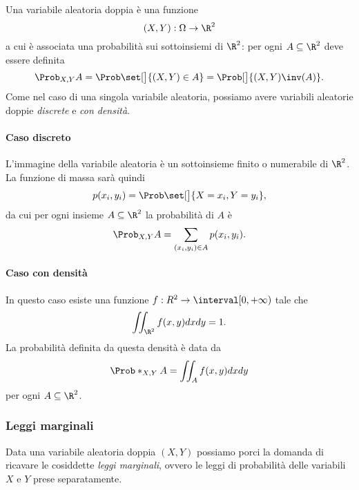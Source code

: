 Una variabile aleatoria doppia è una funzione \[
    (X, Y) : \Omega \to \R^2    
\] a cui è associata una probabilità sui sottoinsiemi di $\R^2$: per ogni $A \subseteq \R^2$ deve essere definita \[
    \Prob_{X, Y}{A} = \Prob\set[\big]{(X, Y) \in A} = \Prob[\big]{(X, Y)\inv (A)}.   
\]
Come nel caso di una singola variabile aleatoria, possiamo avere variabili aleatorie doppie \emph{discrete} e \emph{con densità}.

\paragraph{Caso discreto} L'immagine della variabile aleatoria è un sottoinsieme finito o numerabile di $\R^2$. La funzione di massa sarà quindi \[
    p(x_i, y_i) = \Prob\set[\big]{X = x_i, Y = y_i},    
\] da cui per ogni insieme $A \subseteq \R^2$ la probabilità di $A$ è \[
    \Prob_{X, Y}{A} = \sum_{(x_i, y_i) \in A} p(x_i, y_i).    
\]

\paragraph{Caso con densità} In questo caso esiste una funzione $f : R^2 \to \interval[{0, +\infty})$ tale che \[
    \iint_{\R^2} f(x, y)dxdy = 1.    
\] La probabilità definita da questa densità è data da \[
    \Prob*_{X, Y}{A} = \iint_{A} f(x, y)dxdy    
\] per ogni $A \subseteq \R^2$.

\subsubsection{Leggi marginali}
Data una variabile aleatoria doppia $(X, Y)$ possiamo porci la domanda di ricavare le cosiddette \emph{leggi marginali}, ovvero le leggi di probabilità delle variabili $X$ e $Y$ prese separatamente.


